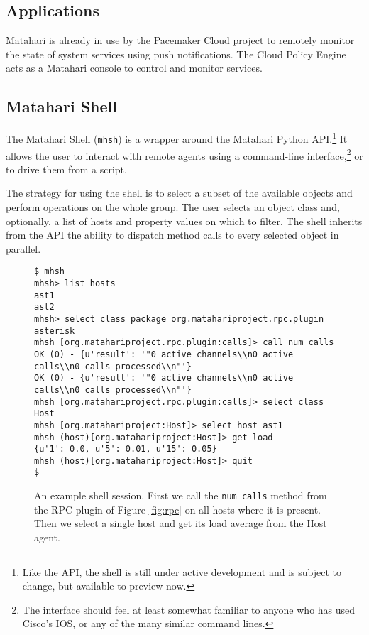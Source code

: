 \documentclass{tufte-handout}
\begin{document}
\subsection{Applications}

Matahari is already in use by the \href{http://pacemaker-cloud.org/}{Pacemaker Cloud} project to remotely monitor the state of system services using push notifications. The Cloud Policy Engine acts as a Matahari console to control and monitor services.

\subsection{Matahari Shell}

The Matahari Shell (\texttt{mhsh}) is a wrapper around the Matahari Python API.\footnote{Like the API, the shell is still under active development and is subject to change, but available to preview now.} It allows the user to interact with remote agents using a command-line interface,\footnote{The interface should feel at least somewhat familiar to anyone who has used Cisco's IOS, or any of the many similar command lines.} or to drive them from a script.

The strategy for using the shell is to select a subset of the available objects and perform operations on the whole group.
The user selects an object class and, optionally, a list of hosts and property values on which to filter.
The shell inherits from the API the ability to dispatch method calls to every selected object in parallel.

\begin{figure*}[hb]
\begin{Verbatim}
$ mhsh
mhsh> list hosts
ast1
ast2
mhsh> select class package org.matahariproject.rpc.plugin asterisk
mhsh [org.matahariproject.rpc.plugin:calls]> call num_calls
OK (0) - {u'result': '"0 active channels\\n0 active calls\\n0 calls processed\\n"'}
OK (0) - {u'result': '"0 active channels\\n0 active calls\\n0 calls processed\\n"'}
mhsh [org.matahariproject.rpc.plugin:calls]> select class Host
mhsh [org.matahariproject:Host]> select host ast1
mhsh (host)[org.matahariproject:Host]> get load
{u'1': 0.0, u'5': 0.01, u'15': 0.05}
mhsh (host)[org.matahariproject:Host]> quit
$
\end{Verbatim}
\caption{An example shell session. First we call the \texttt{num\_calls} method from the RPC plugin of Figure \ref{fig:rpc} on all hosts where it is present. Then we select a single host and get its load average from the Host agent.}
\label{fig:shell}
\end{figure*}
\end{document}
